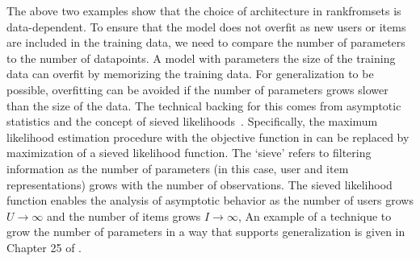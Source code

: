 
The above two examples show that the choice of architecture in
\acrshort{rankfromsets} is data-dependent. To ensure that the model does not
overfit as new users or items are included in the training data, we need to
compare the number of parameters to the number of datapoints. A model with
parameters the size of the training data can overfit by memorizing the training
data. For generalization to be possible, overfitting can be avoided if the
number of parameters grows slower than the size of the data. The technical
backing for this comes from asymptotic statistics and the concept of sieved
likelihoods~\citet{vaart_1998}. Specifically, the maximum likelihood estimation procedure with the
objective function in  can be replaced by maximization of a
sieved likelihood function. The `sieve' refers to filtering information as the
number of parameters (in this case, user and item representations) grows with
the number of observations. The sieved likelihood function enables the analysis
of asymptotic behavior as the number of users grows $U\rightarrow \infty$ and
the number of items grows $I\rightarrow \infty$, An example of a technique to
grow the number of parameters in a way that supports generalization is given in
Chapter 25 of \citet{vaart_1998}.

